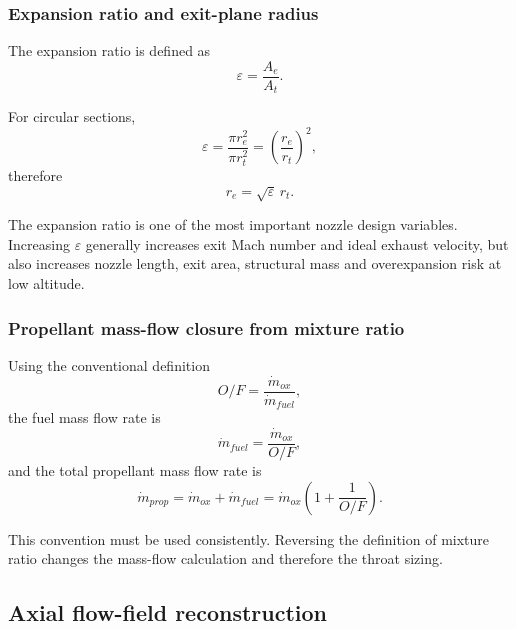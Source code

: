 \documentclass[11pt,a4paper]{article}
\begin{document}
\subsubsection{Expansion ratio and exit-plane radius}

The expansion ratio is defined as
\begin{equation}
\varepsilon=\frac{A_e}{A_t} .
\label{eq:expansion_ratio}
\end{equation}

For circular sections,
\begin{equation}
\varepsilon=\frac{\pi r_e^2}{\pi r_t^2}=\left(\frac{r_e}{r_t}\right)^2,
\end{equation}
therefore
\begin{equation}
r_e=\sqrt{\varepsilon}\,r_t .
\label{eq:exit_radius}
\end{equation}

The expansion ratio is one of the most important nozzle design variables. Increasing $\varepsilon$ generally increases exit Mach number and ideal exhaust velocity, but also increases nozzle length, exit area, structural mass and overexpansion risk at low altitude.

\subsubsection{Propellant mass-flow closure from mixture ratio}

Using the conventional definition
\begin{equation}
O/F=\frac{\dot{m}_{ox}}{\dot{m}_{fuel}},
\end{equation}
the fuel mass flow rate is
\begin{equation}
\dot{m}_{fuel}=\frac{\dot{m}_{ox}}{O/F},
\end{equation}
and the total propellant mass flow rate is
\begin{equation}
\dot{m}_{prop}=\dot{m}_{ox}+\dot{m}_{fuel}
=\dot{m}_{ox}\left(1+\frac{1}{O/F}\right).
\label{eq:mdot_total}
\end{equation}

This convention must be used consistently. Reversing the definition of mixture ratio changes the mass-flow calculation and therefore the throat sizing.

% 

\subsection{Axial flow-field reconstruction}
\end{document}
